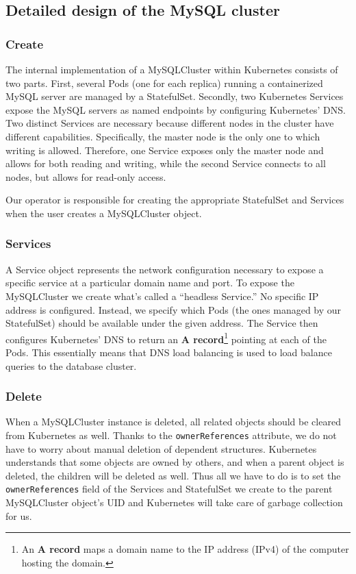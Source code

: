 \subsection{Detailed design of the MySQL cluster}

\subsubsection*{Create}
The internal implementation of a MySQLCluster within Kubernetes consists of two parts. First,
several Pods (one for each replica) running a containerized MySQL server are managed by a
StatefulSet. Secondly, two Kubernetes Services expose the MySQL servers as named endpoints by
configuring Kubernetes' DNS. Two distinct Services are necessary because different nodes in the
cluster have different capabilities. Specifically, the master node is the only one to which writing
is allowed. Therefore, one Service exposes only the  master node and allows for both reading and
writing, while the second Service connects to all nodes, but allows for read-only access.

Our operator is responsible for creating the appropriate StatefulSet and Services when the user
creates a MySQLCluster object.

\subsubsection*{Services}
A Service object represents the network configuration necessary to expose a specific service at a
particular domain name and port. To expose the MySQLCluster we create what's called a
“headless Service.” No specific IP address is configured. Instead, we specify which Pods (the ones
managed by our StatefulSet) should be available under the given address. The Service then configures
Kubernetes' DNS to return an \textbf{A record}\footnote{An \textbf{A record} maps a domain name to
the IP address (IPv4) of the computer hosting the domain.} pointing at each of the Pods. This
essentially means that DNS load balancing is used to load balance queries to the database cluster.

\subsubsection*{Delete}
When a MySQLCluster instance is deleted, all related objects should be cleared from Kubernetes
as well. Thanks to the \texttt{ownerReferences} attribute, we do not have to worry about manual
deletion of dependent structures. Kubernetes understands that some objects are owned by others, and
when a parent object is deleted, the children will be deleted as well. Thus all we have to do is to set
the \texttt{ownerReferences} field of the Services and StatefulSet we create to the parent
MySQLCluster object's UID and Kubernetes will take care of garbage collection for us.

